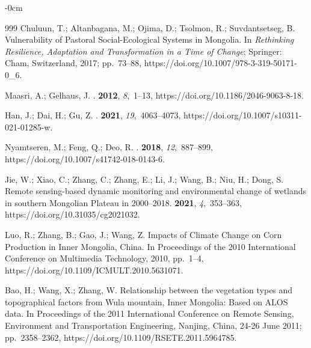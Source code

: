 \documentclass[geosciences,article,accept,pdftex,oneauthor]{Definitions/mdpi}
\begin{document}
\begin{adjustwidth}{-\extralength}{0cm}
\begin{thebibliography}{999}
Chuluun, T.; Altanbagana, M.; Ojima, D.; Tsolmon, R.; Suvdantsetseg, B.
  {Vulnerability of Pastoral Social-Ecological Systems in Mongolia}.
\newblock In {\em {Rethinking Resilience, Adaptation and Transformation in a
  Time of Change}}; Springer: Cham,  Switzerland, 2017; pp.~73--88, https://doi.org/10.1007/978-3-319-50171-0\_6.

Maasri, A.; Gelhaus, J.
.
 {\bf 2012}, {\em 8},~1--13, https://doi.org/10.1186/2046-9063-8-18.

Han, J.; Dai, H.; Gu, Z.
.
 {\bf 2021}, {\em
  19},~4063--4073, https://doi.org/10.1007/s10311-021-01285-w.

Nyamtseren, M.; Feng, Q.; Deo, R.
.
 {\bf 2018},
  {\em 12},~887--899, https://doi.org/10.1007/s41742-018-0143-6.

Jie, W.; Xiao, C.; Zhang, C.; Zhang, E.; Li, J.; Wang, B.; Niu, H.; Dong, S.
\newblock Remote sensing-based dynamic monitoring and environmental change of
  wetlands in southern Mongolian Plateau in 2000–2018.
 {\bf 2021}, {\em 4},~353--363, https://doi.org/10.31035/cg2021032.

Luo, R.; Zhang, B.; Gao, J.; Wang, Z.
\newblock Impacts of Climate Change on Corn Production in Inner Mongolia,
  China.
\newblock In Proceedings of the 2010 International Conference on Multimedia
  Technology,  2010, pp.~1--4, https://doi.org/10.1109/ICMULT.2010.5631071.

Bao, H.; Wang, X.; Zhang, W.
\newblock Relationship between the vegetation types and topographical factors
  from Wula mountain, Inner Mongolia: Based on ALOS data.
\newblock In Proceedings of the 2011 International Conference on Remote
  Sensing, Environment and Transportation Engineering, Nanjing, China, 24-26 June 2011; 
  pp.~2358--2362, https://doi.org/10.1109/RSETE.2011.5964785.


\end{thebibliography}
\end{adjustwidth}
\end{document}
